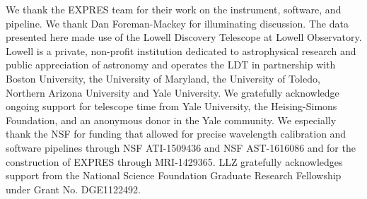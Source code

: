 \documentclass[modern]{aastex63}
\begin{document}
\acknowledgements
We thank the EXPRES team for their work on the instrument, software, and pipeline.  We thank Dan Foreman-Mackey for illuminating discussion.  The data presented here made use of the Lowell Discovery Telescope at Lowell Observatory. Lowell is a private, non-profit institution dedicated to astrophysical research and public appreciation of astronomy and operates the LDT in partnership with Boston University, the University of Maryland, the University of Toledo, Northern Arizona University and Yale University. We gratefully acknowledge ongoing support for telescope time from Yale University, the Heising-Simons Foundation, and an anonymous donor in the Yale community. We especially thank the NSF for funding that allowed for precise wavelength calibration and software pipelines through NSF ATI-1509436 and NSF AST-1616086 and for the construction of EXPRES through MRI-1429365.  LLZ gratefully acknowledges support from the National Science Foundation Graduate Research Fellowship under Grant No. DGE1122492.


\end{document}
